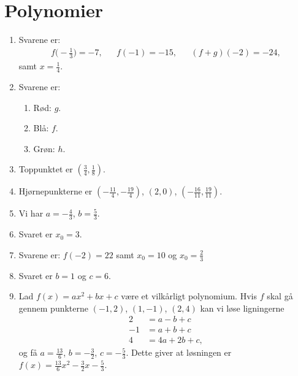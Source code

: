 \section{Polynomier}
\begin{enumerate}
	\item Svarene er:
	\begin{align*}
	f\Big(-\frac{1}{3}\Big)=-7,&&f(-1)=-15,&& (f+g)(-2)=-24,
	\end{align*} 
	samt $x=\frac{1}{4}$.
	
	\item \label{it:poly1ans} Svarene er:
	\begin{enumerate}
		\item Rød: $g$.
		\item Blå: $f$.
		\item Grøn: $h$.
	\end{enumerate}
	
	\item Toppunktet er $ (\frac{3}{4},\frac{1}{8}) $.
	
	\item Hjørnepunkterne er $(-\frac{11}{4},-\frac{19}{4})$, $ (2,0) $, $ (-\frac{16}{11},\frac{19}{11}) $.
	
	\item Vi har $a=-\frac{4}{3}$, $ b=\frac{5}{3} $.
	
	\item Svaret er $ x_0=3 $.
	
	\item Svarene er: $ f(-2)=22 $ samt $x_0=10$ og $x_0=\frac{2}{3}$
	
	\item Svaret er $b=1$ og $c=6$.
	
	\item Lad $f(x)=ax^2+bx+c$ være et vilkårligt polynomium. Hvis $f$ skal gå gennem punkterne $(-1,2)$, $(1,-1)$, $(2,4)$ kan vi løse ligningerne
	\begin{align*}
	2&=a-b+c\\
	-1&=a+b+c\\
	4&=4a+2b+c,
	\end{align*}
	og få $ a=\frac{13}{6} $, $ b=-\frac{3}{2} $, $ c=-\frac{5}{3} $. Dette giver at løsningen er $ f(x)=\frac{13}{6}x^2-\frac{3}{2}x-\frac{5}{3} $.
	

\end{enumerate}
